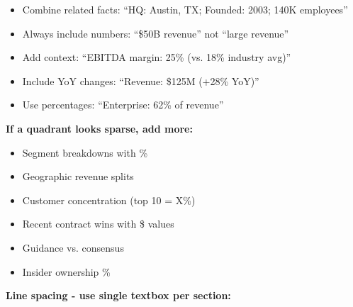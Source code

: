 \documentclass[11pt]{article}
\begin{document}
\begin{itemize}[leftmargin=*,itemsep=2pt,topsep=2pt]
\item {} Combine related facts: ``HQ: Austin, TX; Founded: 2003; 140K employees''
\item {} Always include numbers: ``\$50B revenue'' not ``large revenue''
\item {} Add context: ``EBITDA margin: 25\% (vs. 18\% industry avg)''
\item {} Include YoY changes: ``Revenue: \$125M (+28\% YoY)''
\item {} Use percentages: ``Enterprise: 62\% of revenue''
\end{itemize}

\textbf{If a quadrant looks sparse, add more:}

\begin{itemize}[leftmargin=*,itemsep=2pt,topsep=2pt]
\item {} Segment breakdowns with \%
\item {} Geographic revenue splits
\item {} Customer concentration (top 10 = X\%)
\item {} Recent contract wins with \$ values
\item {} Guidance vs. consensus
\item {} Insider ownership \%
\end{itemize}

\textbf{Line spacing - use single textbox per section:}
\end{document}
